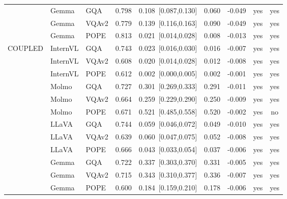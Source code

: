 \begin{longtable}{@{}lll rrrr cc@{}}
 & Gemma & GQA & 0.798 & 0.108~{\scriptsize[0.087,0.130]} & 0.060 & -0.049 & yes & yes \\
 & Gemma & VQAv2 & 0.779 & 0.139~{\scriptsize[0.116,0.163]} & 0.090 & -0.049 & yes & yes \\
 & Gemma & POPE & 0.813 & 0.021~{\scriptsize[0.014,0.028]} & 0.008 & -0.013 & yes & yes \\
\midrule
COUPLED & InternVL & GQA & 0.743 & 0.023~{\scriptsize[0.016,0.030]} & 0.016 & -0.007 & yes & yes \\
 & InternVL & VQAv2 & 0.608 & 0.020~{\scriptsize[0.014,0.028]} & 0.012 & -0.008 & yes & yes \\
 & InternVL & POPE & 0.612 & 0.002~{\scriptsize[0.000,0.005]} & 0.002 & -0.001 & yes & yes \\
 & Molmo & GQA & 0.727 & 0.301~{\scriptsize[0.269,0.333]} & 0.291 & -0.011 & yes & yes \\
 & Molmo & VQAv2 & 0.664 & 0.259~{\scriptsize[0.229,0.290]} & 0.250 & -0.009 & yes & yes \\
 & Molmo & POPE & 0.671 & 0.521~{\scriptsize[0.485,0.558]} & 0.520 & -0.002 & yes & no \\
 & LLaVA & GQA & 0.744 & 0.059~{\scriptsize[0.046,0.072]} & 0.049 & -0.010 & yes & yes \\
 & LLaVA & VQAv2 & 0.639 & 0.060~{\scriptsize[0.047,0.075]} & 0.052 & -0.008 & yes & yes \\
 & LLaVA & POPE & 0.666 & 0.043~{\scriptsize[0.033,0.054]} & 0.037 & -0.006 & yes & yes \\
 & Gemma & GQA & 0.722 & 0.337~{\scriptsize[0.303,0.370]} & 0.331 & -0.005 & yes & yes \\
 & Gemma & VQAv2 & 0.715 & 0.343~{\scriptsize[0.310,0.377]} & 0.336 & -0.007 & yes & yes \\
 & Gemma & POPE & 0.600 & 0.184~{\scriptsize[0.159,0.210]} & 0.178 & -0.006 & yes & yes \\
\end{longtable}
